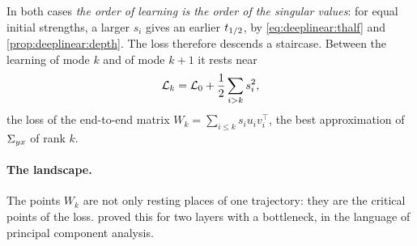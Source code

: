\begin{refsection}
In both cases \emph{the order of learning is the order of the singular values}: for equal initial strengths, a larger $s_i$ gives an earlier $t_{1/2}$, by \eqref{eq:deeplinear:thalf} and \cref{prop:deeplinear:depth}. The loss therefore descends a staircase. Between the learning of mode $k$ and of mode $k+1$ it rests near
\begin{equation}\label{eq:deeplinear:staircase}
  \mathcal{L}_k=\mathcal{L}_0+\frac12\sum_{i>k}s_i^2 ,
\end{equation}
the loss of the end-to-end matrix $W_k=\sum_{i\le k}s_iu_iv_i^\top$, the best approximation of $\Sigma_{yx}$ of rank $k$.

\paragraph{The landscape.} The points $W_k$ are not only resting places of one trajectory: they are the critical points of the loss. \Textcite{BaldiHornik1989} proved this for two layers with a bottleneck, in the language of principal component analysis.



\end{refsection}
